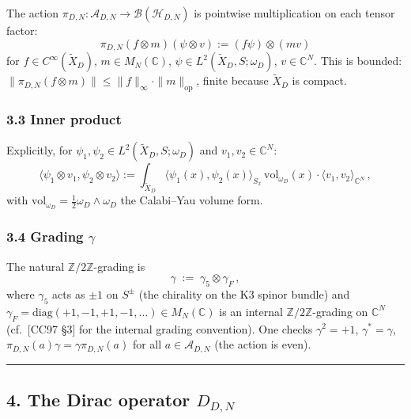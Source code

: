 \documentclass[
  11pt,
  a4paper,
]{amsart}
\begin{document}
The action \(\pi_{D,N} : \mathcal{A}_{D,N} \to \mathcal{B}(\mathcal{H}_{D,N})\) is
pointwise multiplication on each tensor factor:
\[ \pi_{D,N}(f \otimes m)(\psi \otimes v) := (f\psi) \otimes (mv) \]
for \(f \in C^\infty(\widetilde{X}_D)\), \(m \in M_N(\mathbb{C})\),
\(\psi \in L^2(\widetilde{X}_D, S; \omega_D)\), \(v \in \mathbb{C}^N\). This is
bounded: \(\|\pi_{D,N}(f\otimes m)\| \le \|f\|_\infty \cdot \|m\|_{\mathrm{op}}\),
finite because \(\widetilde{X}_D\) is compact.

\hypertarget{inner-product}{%
\subsubsection{3.3 Inner product}\label{inner-product}}

Explicitly, for \(\psi_1, \psi_2 \in L^2(\widetilde{X}_D, S; \omega_D)\) and
\(v_1, v_2 \in \mathbb{C}^N\):
\[
\langle \psi_1 \otimes v_1, \psi_2 \otimes v_2 \rangle
:= \int_{\widetilde{X}_D} \langle \psi_1(x), \psi_2(x) \rangle_{S_x}\, \mathrm{vol}_{\omega_D}(x) \cdot \langle v_1, v_2 \rangle_{\mathbb{C}^N}\,,
\]
with \(\mathrm{vol}_{\omega_D} = \tfrac{1}{2}\omega_D \wedge \omega_D\) the
Calabi--Yau volume form.

\hypertarget{grading-gamma}{%
\subsubsection{\texorpdfstring{3.4 Grading \(\gamma\)}{3.4 Grading \textbackslash gamma}}\label{grading-gamma}}

The natural \(\mathbb{Z}/2\mathbb{Z}\)-grading is
\begin{equation}\label{eq:grading}
\gamma \;:=\; \gamma_5 \otimes \gamma_F\,,
\end{equation}
where \(\gamma_5\) acts as \(\pm 1\) on \(S^\pm\) (the chirality on the K3 spinor
bundle) and \(\gamma_F = \mathrm{diag}(+1, -1, +1, -1, \dots) \in M_N(\mathbb{C})\)
is an internal \(\mathbb{Z}/2\mathbb{Z}\)-grading on \(\mathbb{C}^N\) (cf.~{[}CC97 §3{]}
for the internal grading convention). One checks \(\gamma^2 = +1\),
\(\gamma^* = \gamma\), \(\pi_{D,N}(a)\gamma = \gamma\pi_{D,N}(a)\) for all
\(a \in \mathcal{A}_{D,N}\) (the action is even).

\begin{center}\rule{0.5\linewidth}{0.5pt}\end{center}

\hypertarget{the-dirac-operator-d_dn}{%
\subsection{\texorpdfstring{4. The Dirac operator \(D_{D,N}\)}{4. The Dirac operator D\_\{D,N\}}}\label{the-dirac-operator-d_dn}}
\end{document}
